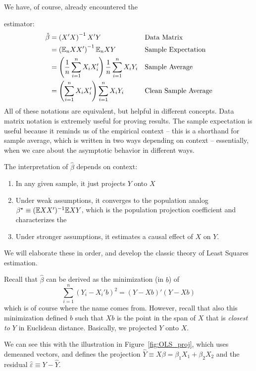 \documentclass[10pt]{article}
\begin{document}
We have, of course, already encountered the 

\begin{definition}
	 estimator:
	\begin{align*}
		\hat{\beta} &= \left( X' X\right)^{-1} X' Y &&\text{Data Matrix}\\
		&= \left( \mathbb{E}_n XX'\right)^{-1} \mathbb{E}_n XY &&\text{Sample Expectation}\\
		&= \left( \frac{1}{n} \sum_{i=1}^n X_i X_i'\right) \frac{1}{n} \sum_{i=1}^n X_i Y_i &&\text{Sample Average}\\
	 &= \left(  \sum_{i=1}^n X_i X_i'\right)  \sum_{i=1}^n X_i Y_i &&\text{Clean Sample Average}
	\end{align*}
	All of these notations are equivalent, but helpful in different concepts. Data matrix notation is extremely useful for proving results. The sample expectation is useful because it reminds us of the empirical context -- this is a shorthand for sample average, which is written in two ways depending on context -- essentially, when we care about the asymptotic behavior in different ways.
	
	The interpretation of $\hat{\beta}$ depends on context:
	\begin{enumerate}
		\item In any given sample, it just projects $Y$ onto $X$
		\item Under weak assumptions, it converges to the population analog $\beta^\star \equiv (\mathbb{E} XX')^{-1} \mathbb{E} XY$, which is the population projection coefficient and characterizes the 
		\item Under stronger assumptions, it estimates a causal effect of $X$ on $Y$.
	\end{enumerate}
	We will elaborate these in order, and develop the classic theory of Least Squares estimation.
\end{definition}

Recall that $\hat{\beta}$ can be derived as the minimization (in $b$) of
\[
\sum_{i=1}^n (Y_i - X_i'b)^2 = (Y - Xb)'(Y - Xb)
\]
which is of course where the name comes from. However, recall that also this minimization defined $b$ such that $Xb$ is the point in the span of $X$ that is \emph{closest to $Y$} in Euclidean distance. Basically, we projected $Y$ onto $X$.

We can see this with the illustration in Figure~\ref{fig:OLS_proj}, which uses demeaned vectors, and defines the projection $\hat{Y} \equiv X\beta = \beta_1 X_1 + \beta_2X_2$ and the residual $\hat{\varepsilon} \equiv Y -  \hat{Y}$.
\end{document}
